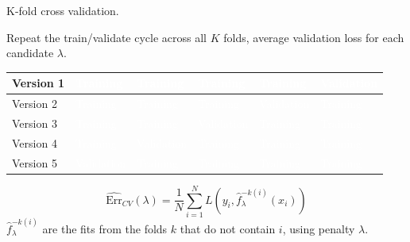 \documentclass[xcolor={table}, handout]{beamer}
\begin{document}

\begin{frame}{K-fold cross validation.}

\begin{wideitemize}
  \scriptsize
\item Repeat the train/validate cycle across all $K$ folds, average validation loss for each candidate $\lambda$.
\end{wideitemize}

\begin{table}[]
\renewcommand{\arraystretch}{2.5}
\begin{tabular}{l >{\centering\arraybackslash}m{2cm} |>{\centering\arraybackslash}p{2cm}|>{\centering\arraybackslash}p{2cm}|>{\centering\arraybackslash}p{2cm}|>{\centering\arraybackslash}p{2cm} }
Version 1 & \cellcolor{Contrast1l} \textcolor{white}{Training} & \cellcolor{Contrast1l} \textcolor{white}{Training} & \cellcolor{Contrast1l} \textcolor{white}{Training} & \cellcolor{Contrast1l} \textcolor{white}{Training} & \cellcolor{Contrast4l} \textcolor{white}{Validation} \\
\hline
Version 2 & \cellcolor{Contrast1l} \textcolor{white}{Training}& \cellcolor{Contrast1l} \textcolor{white}{Training}& \cellcolor{Contrast1l} \textcolor{white}{Training} & \cellcolor{Contrast4l} \textcolor{white}{Validation} & \cellcolor{Contrast1l} \textcolor{white}{Training} \\
\hline
Version 3 &  \cellcolor{Contrast1l} \textcolor{white}{Training} & \cellcolor{Contrast1l} \textcolor{white}{Training}&\cellcolor{Contrast4l} \textcolor{white}{Validation}& \cellcolor{Contrast1l} \textcolor{white}{Training} & \cellcolor{Contrast1l} \textcolor{white}{Training} \\
\hline
Version 4 & \cellcolor{Contrast1l} \textcolor{white}{Training}& \cellcolor{Contrast4l} \textcolor{white}{Validation}& \cellcolor{Contrast1l} \textcolor{white}{Training}& \cellcolor{Contrast1l} \textcolor{white}{Training}  & \cellcolor{Contrast1l} \textcolor{white}{Training} \\
\hline
Version 5 & \cellcolor{Contrast4l} \textcolor{white}{Validation}& \cellcolor{Contrast1l} \textcolor{white}{Training}& \cellcolor{Contrast1l} \textcolor{white}{Training}& \cellcolor{Contrast1l} \textcolor{white}{Training}  & \cellcolor{Contrast1l} \textcolor{white}{Training} \\
\hline
\end{tabular}
\end{table}

\[
\widehat{\textrm{Err}}_{CV}(\lambda) = \frac{1}{N}\sum_{i = 1}^N L\left(y_i, \hat{f}^{-k(i)}_{\lambda}(x_i) \right)
\]
$\hat{f}^{-k(i)}_{\lambda}$ are the fits from the folds $k$ that do not contain $i$, using penalty $\lambda$. 


\end{frame}
\end{document}
